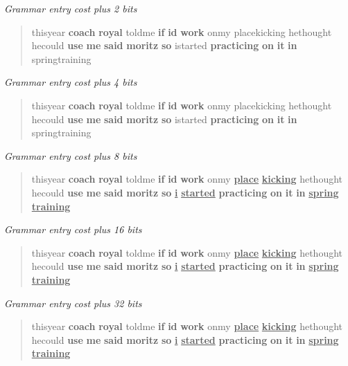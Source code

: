 \documentclass[11pt, oneside, fleqn]{article}
\begin{document}
\textsl{Grammar entry cost plus 2 bits}
\begin{quote}thisyear \textbf{coach} \textbf{royal} toldme \textbf{if} \textbf{id} \textbf{work} onmy placekicking hethought hecould \textbf{use} \textbf{me} \textbf{said} \textbf{moritz} \textbf{so} istarted \textbf{practicing} \textbf{on} \textbf{it} \textbf{in} springtraining\end{quote}
	\vspace{1em}

\textsl{Grammar entry cost plus 4 bits}
\begin{quote}thisyear \textbf{coach} \textbf{royal} toldme \textbf{if} \textbf{id} \textbf{work} onmy placekicking hethought hecould \textbf{use} \textbf{me} \textbf{said} \textbf{moritz} \textbf{so} istarted \textbf{practicing} \textbf{on} \textbf{it} \textbf{in} springtraining\end{quote}
	\vspace{1em}

\textsl{Grammar entry cost plus 8 bits}
\begin{quote}thisyear \textbf{coach} \textbf{royal} toldme \textbf{if} \textbf{id} \textbf{work} onmy \textbf{\underline{place}} \textbf{\underline{kicking}} hethought hecould \textbf{use} \textbf{me} \textbf{said} \textbf{moritz} \textbf{so} \textbf{\underline{i}} \textbf{\underline{started}} \textbf{practicing} \textbf{on} \textbf{it} \textbf{in} \textbf{\underline{spring}} \textbf{\underline{training}}\end{quote}
	\vspace{1em}

\textsl{Grammar entry cost plus 16 bits}
\begin{quote}thisyear \textbf{coach} \textbf{royal} toldme \textbf{if} \textbf{id} \textbf{work} onmy \textbf{\underline{place}} \textbf{\underline{kicking}} hethought hecould \textbf{use} \textbf{me} \textbf{said} \textbf{moritz} \textbf{so} \textbf{\underline{i}} \textbf{\underline{started}} \textbf{practicing} \textbf{on} \textbf{it} \textbf{in} \textbf{\underline{spring}} \textbf{\underline{training}}\end{quote}
	\vspace{1em}

\textsl{Grammar entry cost plus 32 bits}
\begin{quote}thisyear \textbf{coach} \textbf{royal} toldme \textbf{if} \textbf{id} \textbf{work} onmy \textbf{\underline{place}} \textbf{\underline{kicking}} hethought hecould \textbf{use} \textbf{me} \textbf{said} \textbf{moritz} \textbf{so} \textbf{\underline{i}} \textbf{\underline{started}} \textbf{practicing} \textbf{on} \textbf{it} \textbf{in} \textbf{\underline{spring}} \textbf{\underline{training}}\end{quote}
	\vspace{1em}
\end{document}
